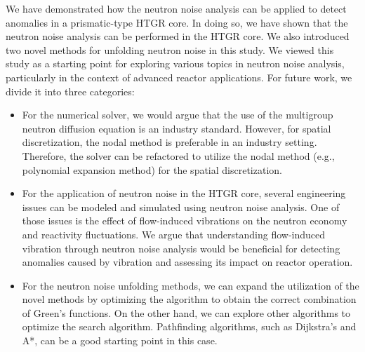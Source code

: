 We have demonstrated how the neutron noise analysis can be applied to detect anomalies in a prismatic-type HTGR core. In doing so, we have shown that the neutron noise analysis can be performed in the HTGR core. We also introduced two novel methods for unfolding neutron noise in this study. We viewed this study as a starting point for exploring various topics in neutron noise analysis, particularly in the context of advanced reactor applications. For future work, we divide it into three categories:
\begin{itemize}
    \item For the numerical solver, we would argue that the use of the multigroup neutron diffusion equation is an industry standard. However, for spatial discretization, the nodal method is preferable in an industry setting. Therefore, the solver can be refactored to utilize the nodal method (e.g., polynomial expansion method) for the spatial discretization.
    \item For the application of neutron noise in the HTGR core, several engineering issues can be modeled and simulated using neutron noise analysis. One of those issues is the effect of flow-induced vibrations on the neutron economy and reactivity fluctuations. We argue that understanding flow-induced vibration through neutron noise analysis would be beneficial for detecting anomalies caused by vibration and assessing its impact on reactor operation.
    \item For the neutron noise unfolding methods, we can expand the utilization of the novel methods by optimizing the algorithm to obtain the correct combination of Green's functions. On the other hand, we can explore other algorithms to optimize the search algorithm. Pathfinding algorithms, such as Dijkstra's and A*, can be a good starting point in this case.
\end{itemize}